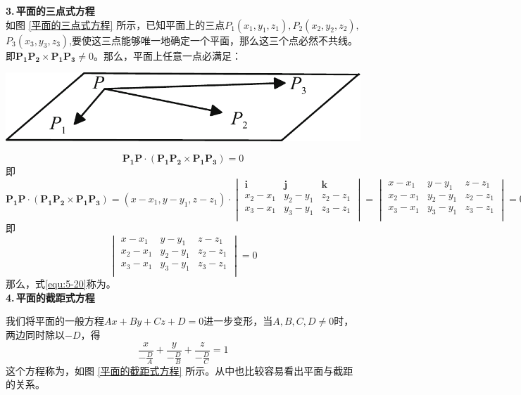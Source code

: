 \noindent
\begin{minipage}{0.6\linewidth}
\textbf{3.$\,$平面的三点式方程}\\
\hspace*{2em}如图 \ref{平面的三点式方程} 所示，已知平面上的三点$P_1(x_1,y_1,z_1), P_2(x_2,y_2,z_2),$ $P_3(x_3,y_3,z_3)$,要使这三点能够唯一地确定一个平面，那么这三个点必然不共线。即$\boldsymbol{P_1P_2}\times\boldsymbol{P_1P_3}\neq 0$。那么，平面上任意一点必满足：
\end{minipage}
\begin{minipage}{0.4\linewidth}
	\centering
	\includegraphics[width = 0.85\linewidth]{pic/C-5/plane2}
	\vspace*{-1em}
	\label{平面的三点式方程}
\end{minipage}
\begin{equation}
	\boldsymbol{P_1P}\cdot(\boldsymbol{P_1P_2}\times\boldsymbol{P_1P_3})=0
\end{equation}
即\begin{equation}
	\boldsymbol{P_1P}\cdot(\boldsymbol{P_1P_2}\times\boldsymbol{P_1P_3})=(x-x_1,y-y_1,z-z_1)\cdot
	\begin{vmatrix}
		\boldsymbol{i} & \boldsymbol{j} & \boldsymbol{k}\\
		x_2-x_1 & y_2-y_1 & z_2-z_1\\
		x_3-x_1 & y_3-y_1 & z_3-z_1\\
	\end{vmatrix}=
\begin{vmatrix}
	x-x_1 & y-y_1 & z-z_1\\
	x_2-x_1 & y_2-y_1 & z_2-z_1\\
	x_3-x_1 & y_3-y_1 & z_3-z_1\\
\end{vmatrix}=0
\end{equation}
即\begin{equation}
	\begin{vmatrix}
		x-x_1 & y-y_1 & z-z_1\\
		x_2-x_1 & y_2-y_1 & z_2-z_1\\
		x_3-x_1 & y_3-y_1 & z_3-z_1\\
	\end{vmatrix}=0
\label{equ:5-20}
\end{equation}
那么，式\eqref{equ:5-20}称为。\\[1em]
\textbf{4.$\,$平面的截距式方程}
\par 我们将平面的一般方程$Ax+By+Cz+D=0$进一步变形，当$A,B,C,D\neq0$时，两边同时除以$-D$，得
\begin{equation}
	\displaystyle \frac{x}{-\frac{D}{A}}+\frac{y}{-\frac{D}{B}}+\frac{z}{-\frac{D}{C}}
=1\end{equation}
这个方程称为，如图 \ref{平面的截距式方程} 所示。从中也比较容易看出平面与截距的关系。\\

